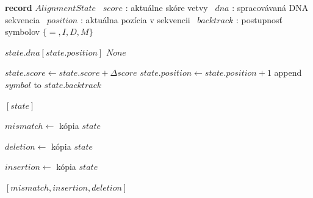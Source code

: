 \begin{algorithm}
\caption{Stav jednej vetvy zarovnania}\label{alg:alignment-state}
\begin{algorithmic}
    \State \textbf{record} $AlignmentState$
    \State \, $score$ : aktuálne skóre vetvy
    \State \, $dna$ : spracovávaná DNA sekvencia
    \State \, $position$ : aktuálna pozícia v sekvencii
    \State \, $backtrack$ : postupnosť symbolov $\{=, I, D, M\}$

            \State \Return $state.dna[state.position]$
        \EndIf
        \State \Return $None$
    \EndFunction

        \State $state.score \gets state.score + \Delta score$
            \State $state.position \gets state.position + 1$
        \EndIf
        \State append $symbol$ to $state.backtrack$
    \EndFunction
\end{algorithmic}
\end{algorithm}

              

\begin{algorithm}
\caption{Generovanie kandidátov pre jednu vetvu}\label{alg:generate-candidates}
\begin{algorithmic}
            \State {}
            \State \Return $[state]$
        \EndIf

        \State $mismatch \gets$ kópia $state$
        \State {}

        \State $deletion \gets$ kópia $state$
        \State {}

        \State $insertion \gets$ kópia $state$
            \State {}
        \EndWhile
        
        \State {}
        

        \State \Return $[mismatch, insertion, deletion]$
    \EndFunction
\end{algorithmic}
\end{algorithm}    

